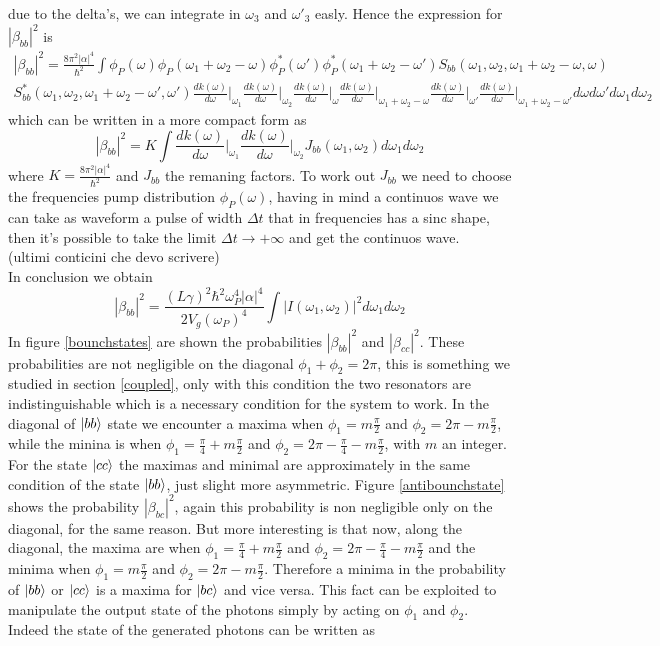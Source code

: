 due to the delta's, we can integrate in $\omega_3$ and $\omega'_3$ easly. Hence the expression for $|\beta_{bb}|^2$ is
\begin{multline}|\beta_{bb}|^2 = \frac{8\pi^2|\alpha|^4}{\hbar^2}\int \phi_P(\omega)\phi_P(\omega_1+\omega_2-\omega)\phi_P^*(\omega')\phi^*_P(\omega_1+\omega_2-\omega')S_{bb}(\omega_1,\omega_2,\omega_1+\omega_2-\omega,\omega)\\ S^*_{bb}(\omega_1,\omega_2,\omega_1+\omega_2-\omega',\omega')
\frac{dk(\omega)}{d\omega}\Bigg|_{\omega_1}\frac{dk(\omega)}{d\omega}\Bigg|_{\omega_2}\frac{dk(\omega)}{d\omega}\Bigg|_{\omega}\frac{dk(\omega)}{d\omega}\Bigg|_{\omega_1+\omega_2-\omega}\frac{dk(\omega)}{d\omega}\Bigg|_{\omega'}\frac{dk(\omega)}{d\omega}\Bigg|_{\omega_1+\omega_2-\omega'} d\omega d\omega'  d\omega_1d\omega_2\end{multline}
which can be written in a more compact form as
\[|\beta_{bb}|^2 = K\int \frac{dk(\omega)}{d\omega}\Bigg|_{\omega_1}\frac{dk(\omega)}{d\omega}\Bigg|_{\omega_2} J_{bb}(\omega_1,\omega_2)d\omega_1 d\omega_2\]
where $K = \frac{8\pi^2|\alpha|^4}{\hbar^2}$ and $J_{bb}$ the remaning factors. To work out $J_{bb}$ we need to choose the frequencies pump distribution $\phi_{P}(\omega)$, having in mind a continuos wave we can take as waveform a pulse of width $\Delta t$ that in frequencies has a sinc shape, then it's possible to take the limit $\Delta t \to +\infty$ and get the continuos wave.\\(ultimi conticini che devo scrivere)\\
In conclusion we obtain
\[|\beta_{bb}|^2 = \frac{(L\gamma)^2\hbar^2\omega_{P}^4 |\alpha|^4}{2V_g(\omega_P)^4}\int |I(\omega_1,\omega_2)|^2d\omega_1 d\omega_2\]
In figure \ref{bounchstates} are shown the probabilities $|\beta_{bb}|^2$ and $|\beta_{cc}|^2$. These probabilities are not negligible on the diagonal $\phi_1 +\phi_2 = 2\pi$, this is something we studied in section \ref{coupled}, only with this condition the two resonators are indistinguishable which is a necessary condition for the system to work. In the diagonal of $\ket{bb}$ state we encounter a maxima when $\phi_1 = m\frac{\pi}{2}$ and $\phi_2 = 2\pi - m\frac{\pi}{2}$, while the minina is when $\phi_1 = \frac{\pi}{4} + m\frac{\pi}{2}$ and $\phi_2 = 2\pi - \frac{\pi}{4} - m\frac{\pi}{2}$, with $m$ an integer. For the state $\ket{cc}$ the maximas and minimal are approximately in the same condition of the state $\ket{bb}$, just slight more asymmetric. Figure \ref{antibounchstate} shows the probability $|\beta_{bc}|^2$, again this probability is non negligible only on the diagonal, for the same reason. But more interesting is that now, along the diagonal, the maxima are when $\phi_1 = \frac{\pi}{4} + m\frac{\pi}{2}$ and $\phi_2 = 2\pi - \frac{\pi}{4} - m\frac{\pi}{2}$ and the minima when $\phi_1 = m\frac{\pi}{2}$ and $\phi_2 = 2\pi - m\frac{\pi}{2}$. Therefore a minima in the probability of $\ket{bb}$ or $\ket{cc}$ is a maxima for $\ket{bc}$ and vice versa. This fact can be exploited to manipulate the output state of the photons simply by acting on $\phi_1$ and $\phi_2$. Indeed the state of the generated photons can be written as
